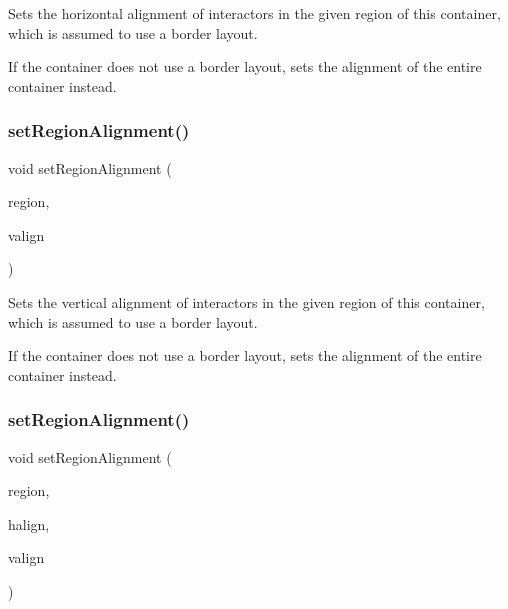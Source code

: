 Sets the horizontal alignment of interactors in the given region of this container, which is assumed to use a border layout. 

If the container does not use a border layout, sets the alignment of the entire container instead. \mbox{\label{classsgl_1_1GContainer_a926942899d029fc9921fe770ac2867bb}} 
\subsubsection{\texorpdfstring{set\+Region\+Alignment()}{setRegionAlignment()}\hspace{0.1cm}{\footnotesize\ttfamily [2/5]}}
{\footnotesize\ttfamily void set\+Region\+Alignment (\begin{DoxyParamCaption}\item[{\mbox{\hyperlink{classsgl_1_1GContainer_a81a01a86de31071a92e6cce0bab9bc4b}{Region}}}]{region,  }\item[{\mbox{\hyperlink{namespacesgl_a9c2ed22cfbd21f13df24ea193b310aee}{Vertical\+Alignment}}}]{valign }\end{DoxyParamCaption})\hspace{0.3cm}{\ttfamily [virtual]}}



Sets the vertical alignment of interactors in the given region of this container, which is assumed to use a border layout. 

If the container does not use a border layout, sets the alignment of the entire container instead. \mbox{\label{classsgl_1_1GContainer_ab4d2bfcca7a18da2847e7b4494da4a16}} 
\subsubsection{\texorpdfstring{set\+Region\+Alignment()}{setRegionAlignment()}\hspace{0.1cm}{\footnotesize\ttfamily [3/5]}}
{\footnotesize\ttfamily void set\+Region\+Alignment (\begin{DoxyParamCaption}\item[{\mbox{\hyperlink{classsgl_1_1GContainer_a81a01a86de31071a92e6cce0bab9bc4b}{Region}}}]{region,  }\item[{\mbox{\hyperlink{namespacesgl_aa00e70829e72ff16addc4d9f06fe3bc5}{Horizontal\+Alignment}}}]{halign,  }\item[{\mbox{\hyperlink{namespacesgl_a9c2ed22cfbd21f13df24ea193b310aee}{Vertical\+Alignment}}}]{valign }\end{DoxyParamCaption})\hspace{0.3cm}{\ttfamily [virtual]}}



